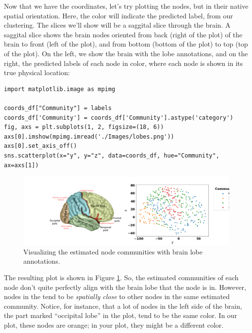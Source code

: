 Now that we have the coordinates, let's try plotting the nodes, but in their native spatial orientation. Here, the color will indicate the predicted label, from our clustering. The slices we'll show will be a saggital slice through the brain. A saggital slice shows the brain nodes oriented from back (right of the plot) of the brain to front (left of the plot), and from bottom (bottom of the plot) to top (top of the plot). On the left, we show the brain with the lobe annotations, and on the right, the predicted labels of each node in color, where each node is shown in its true physical location:

\begin{lstlisting}[style=python]
import matplotlib.image as mpimg

coords_df["Community"] = labels
coords_df['Community'] = coords_df['Community'].astype('category')
fig, axs = plt.subplots(1, 2, figsize=(18, 6))
axs[0].imshow(mpimg.imread('./Images/lobes.png'))
axs[0].set_axis_off()
sns.scatterplot(x="y", y="z", data=coords_df, hue="Community", ax=axs[1])
\end{lstlisting}
\begin{figure}[h]
    \centering
    \includegraphics[width=\linewidth]{foundations/ch2/Images/brain_preds.png}
    \caption[Visualizing estimated node communities in 3D space]{Visualizing the estimated node communities with brain lobe annotations.}
    \label{fig:ch2:brain_preds}
\end{figure}

The resulting plot is shown in Figure \ref{fig:ch2:brain_preds}. So, the estimated communities of each node don't quite perfectly align with the brain lobe that the node is in. However, nodes in the tend to be \emph{spatially close} to other nodes in the same estimated community. Notice, for instance, that a lot of nodes in the left side of the brain, the part marked ``occipital lobe'' in the plot, tend to be the same color. In our plot, these nodes are orange; in your plot, they might be a different color. 

